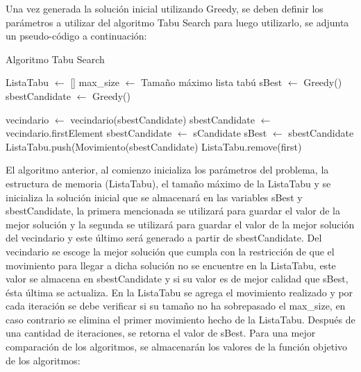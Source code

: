 \documentclass[conference]{IEEEtran}
\begin{document}
Una vez generada la soluci\'on inicial utilizando Greedy, se deben definir los par\'ametros a utilizar del algoritmo Tabu Search para luego utilizarlo, se adjunta un pseudo-c\'odigo a continuaci\'on:

\begin{algorithm}
\caption{Algoritmo Tabu Search}
\begin{algorithmic}[1]

\STATE ListaTabu $\gets$ []
\STATE max\_size $\gets$ Tama\~no m\'aximo lista tab\'u
\STATE sBest $\gets$ Greedy()
\STATE sbestCandidate $\gets$ Greedy()

    \STATE vecindario $\gets$ vecindario(sbestCandidate)
    \STATE sbestCandidate $\gets$ vecindario.firstElement
                \STATE sbestCandidate $\gets$ sCandidate
        \ENDIF
    \ENDFOR
        \STATE sBest $\gets$ sbestCandidate
    \ENDIF
    \STATE ListaTabu.push(Movimiento(sbestCandidate)
        \STATE ListaTabu.remove(first)
    \ENDIF
\ENDWHILE

\end{algorithmic}
\end{algorithm}

El algoritmo anterior, al comienzo inicializa los par\'ametros del problema, la estructura de memoria (ListaTabu), el tama\~no m\'aximo de la ListaTabu y se inicializa la soluci\'on inicial que se almacenar\'a en las variables sBest y sbestCandidate, la primera mencionada se utilizar\'a para guardar el valor de la mejor soluci\'on y la segunda se utilizar\'a para guardar el valor de la mejor soluci\'on del vecindario y este \'ultimo ser\'a generado a partir de sbestCandidate. Del vecindario se escoge la mejor soluci\'on que cumpla con la restricci\'on de que el movimiento para llegar a dicha soluci\'on no se encuentre en la ListaTabu, este valor se almacena en sbestCandidate y si su valor es de mejor calidad que sBest, \'esta \'ultima se actualiza. En la ListaTabu se agrega el movimiento realizado y por cada iteraci\'on se debe verificar si su tama\~no no ha sobrepasado el max\_size, en caso contrario se elimina el primer movimiento hecho de la ListaTabu. Despu\'es de una cantidad de iteraciones, se retorna el valor de sBest. Para una mejor comparaci\'on de los algoritmos, se almacenar\'an los valores de la funci\'on objetivo de los algoritmos:
\end{document}
